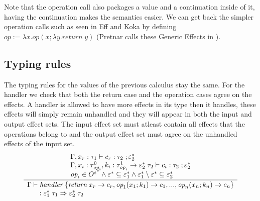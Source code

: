 \documentclass[12pt]{article}
\newcommand\eff[0]{\varepsilon}
\newcommand\effs[0]{\eff^*}
\newcommand\eop[0]{\textit{op}}
\newcommand\eops[1]{O^{#1}}
\newcommand\type[0]{\tau}
\newcommand\tarre[3]{#1 \rightarrow #2 \; #3}
\newcommand\thandler[4]{#1 \; #2 \Rightarrow #3 \; #4}
\newcommand\vabs[2]{\lambda #1 . #2}
\newcommand\vhandler[1]{\textit{handler} \; \{#1\}}
\newcommand\comp[0]{c}
\newcommand\creturn[1]{\textit{return} \; #1}
\newcommand\cop[4]{#1(#2 ; \lambda #3 . #4)}
\begin{document}
Note that the operation call also packages a value and a continuation inside of it, having the continuation makes the semantics easier.
We can get back the simpler operation calls such as seen in Eff and Koka by defining $\eop := \vabs{x}{\cop{\eop}{x}{y}{\creturn{y}}}$ (Pretnar calls these Generic Effects in \cite{pretnar}).

\subsection{Typing rules}

The typing rules for the values of the previous calculus stay the same.
For the handler we check that both the return case and the operation cases agree on the effects.
A handler is allowed to have more effects in its type then it handles, these effects will simply
remain unhandled and they will appear in both the input and output effect sets.
The input effect set must atleast contain all effects that the operations belong to and the output effect set
must agree on the unhandled effects of the input set.
\[\frac{
	\begin{array}{l}
	\Gamma , x_r : \type_1 \vdash \comp_r : \type_2 \; ; \effs_2 \\
	\Gamma , x_i : \type^0_{\eop_i} , k_i : \tarre{\type^1_{\eop_i}}{\effs_2}{\type_2} \vdash \comp_i : \type_2 \; ; \effs_2 \\
	\eop_i \in \eops{\effs} \land \effs \subseteq \effs_1 \land \effs_1 \setminus \effs \subseteq \effs_2 \\
	\end{array}
}{
	\begin{array}{l}
	\Gamma \vdash \vhandler{
		\textit{return} \; x_r \rightarrow \comp_r,
		\eop_1 ( x_1 ; k_1 ) \rightarrow \comp_1,
		...,
		\eop_n ( x_n ; k_n ) \rightarrow \comp_n
	} \\ \indent : \thandler{\effs_1}{\type_1}{\effs_2}{\type_2}
	\end{array}
}\]
\end{document}
